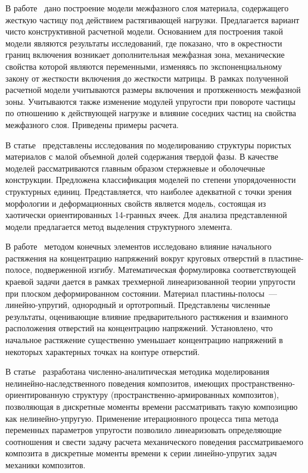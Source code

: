 В работе~\cite{Dudchenko} дано построение модели межфазного слоя материала, содержащего жесткую частицу под действием растягивающей нагрузки. Предлагается вариант чисто конструктивной расчетной модели. Основанием для построения такой модели являются результаты исследований, где показано, что в окрестности границ включения возникает дополнительная межфазная зона, механические свойства которой являются переменными, изменяясь по экспоненциальному закону от жесткости включения до жесткости матрицы. В рамках полученной расчетной модели учитываются размеры включения и протяженность межфазной зоны. Учитываются также изменение модулей упругости при повороте частицы по отношению к действующей нагрузке и влияние соседних частиц на свойства межфазного слоя. Приведены примеры расчета.

В статье~\cite{Chernous} представлены исследования по моделированию структуры пористых материалов с малой объемной долей содержания твердой фазы. В качестве моделей рассматриваются главным образом стержневые и оболочечные конструкции. Предложена классификация моделей по степени упорядоченности структурных единиц. Представляется, что наиболее адекватной с точки зрения морфологии и деформационных свойств является модель, состоящая из хаотически ориентированных 14-гранных ячеек. Для анализа представленной модели предлагается метод выделения структурного элемента.

В работе~\cite{Akbarov} методом конечных элементов исследовано влияние начального растяжения на концентрацию напряжений вокруг круговых отверстий в пластине-полосе, подверженной изгибу. Математическая формулировка соответствующей краевой задачи дается в рамках трехмерной линеаризованной теории упругости при плоском деформированном состоянии. Материал пластины-полосы~--- линейно-упругий, однородный и ортотропный. Представлены численные результаты, оценивающие влияние предварительного растяжения и взаимного расположения отверстий на концентрацию напряжений. Установлено, что начальное растяжение существенно уменьшает концентрацию напряжений в некоторых характерных точках на контуре отверстий.

В статье~\cite{Yankovskiy} разработана численно-аналитическая методика моделирования нелинейно-наследственного поведения композитов, имеющих про\-стран\-ст\-ве\-н\-но-ори\-ен\-ти\-ро\-ва\-н\-ную структуру (пространственно-армированных композитов), позволяющая в дискретные моменты времени рассматривать такую композицию как не\-ли\-ней\-но-уп\-ру\-гую. Применение итерационного процесса типа метода переменных параметров упругости позволило линеаризовать определяющие соотношения и свести задачу расчета механического поведения рассматриваемого композита в дискретные моменты времени к серии ли\-ней\-но-уп\-ру\-гих задач механики композитов. 

